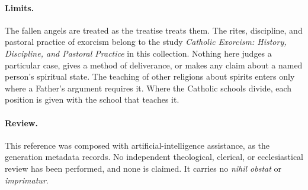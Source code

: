 \paragraph{Limits.} The fallen angels are treated as the treatise treats
them. The rites, discipline, and pastoral practice of exorcism belong to the
study \emph{Catholic Exorcism: History, Discipline, and Pastoral Practice} in
this collection. Nothing here judges a particular case, gives a method of
deliverance, or makes any claim about a named person's spiritual state. The
teaching of other religions about spirits enters only where a Father's
argument requires it. Where the Catholic schools divide, each position is
given with the school that teaches it.

\paragraph{Review.} This reference was composed with artificial-intelligence
assistance, as the generation metadata records. No independent theological,
clerical, or ecclesiastical review has been performed, and none is claimed.
It carries no \emph{nihil obstat} or \emph{imprimatur}.
